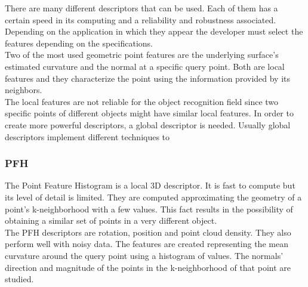 There are many different descriptors that can be used. Each of them has a certain speed in its computing and a reliability and robustness associated. Depending on the application in which they appear the developer must select the features depending on the specifications. 
\\

Two of the most used geometric point features are the underlying surface's estimated curvature and the normal at a specific query point. Both are local features and they characterize the point using the information provided by its neighbors. \\

The local features are not reliable for the object recognition field since two specific points of different objects might have similar local features. In order to create more powerful descriptors, a global descriptor is needed. Usually global descriptors implement different techniques to 


\subsubsection{PFH}
\label{pfh}

The Point Feature Histogram \cite{Rusu} is a local 3D descriptor. 
It is fast to compute but its level of detail is limited. 
They are computed approximating the geometry of a point's k-neighborhood with a few values. 
This fact results in the possibility of obtaining a similar set of points in a very different object. 
\\

The PFH descriptors are rotation, position and point cloud density. 
They also perform well with noisy data. 
The features are created representing the mean curvature around the query point using a histogram of values. 
The normals' direction and magnitude of the points in the k-neighborhood of that point are studied. 
